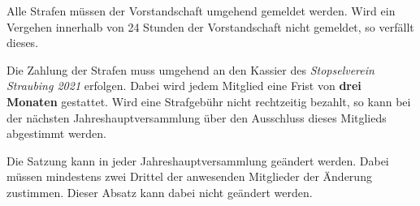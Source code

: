 \documentclass[a4paper,12pt]{scrartcl}
\newcommand{\vereinsName}{Stopselverein Straubing 2021}
\begin{document}
    Alle Strafen müssen der Vorstandschaft umgehend gemeldet werden.
    Wird ein Vergehen innerhalb von 24 Stunden der Vorstandschaft nicht gemeldet,
    so verfällt dieses.

    Die Zahlung der Strafen muss umgehend an den Kassier des \emph{\vereinsName} erfolgen.
    Dabei wird jedem Mitglied eine Frist von \textbf{drei Monaten} gestattet.
    Wird eine Strafgebühr nicht rechtzeitig bezahlt,
    so kann bei der nächsten Jahreshauptversammlung über den Ausschluss dieses Mitglieds abgestimmt werden.

    Die Satzung kann in jeder Jahreshauptversammlung geändert werden.
    Dabei müssen mindestens zwei Drittel der anwesenden Mitglieder der Änderung zustimmen.
    Dieser Absatz kann dabei nicht geändert werden.

    \clearpage
    \appendix

    
\end{document}
